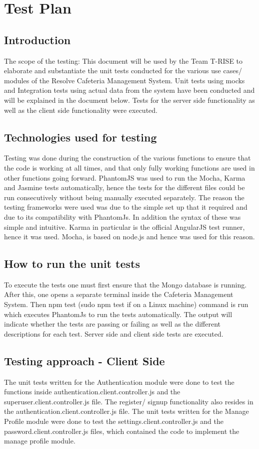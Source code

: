 \documentclass[a4paper,12pt]{report}
\begin{document}
\section{Test Plan}

\subsection{Introduction}
The scope of the testing: This document will be used by the Team T-RISE to elaborate and substantiate the unit tests conducted for the various use cases/ modules of the Resolve Cafeteria Management System. Unit tests using mocks and Integration tests using actual data from the system have been conducted and will be explained in the document below. Tests for the server side functionality as well as the client side functionality were executed.

\subsection{Technologies used for testing}
Testing was done during the construction of the various functions to ensure that the code is working at all times, and that only fully working functions are used in other functions going forward. PhantomJS was used to run the Mocha, Karma and Jasmine tests automatically, hence the tests for the different files could be run consecutively without being manually executed separately. The reason the testing frameworks were used was due to the simple set up that it required and due to its compatibility with PhantomJs. In addition the syntax of these was simple and intuitive.  Karma in particular is the official AngularJS test runner, hence it was used. Mocha, is based on node.js and hence was used for this reason. 
\\
\subsection{How to run the unit tests}
To execute the tests one must first ensure that the Mongo database is running. After this, one opens a separate terminal inside the Cafeteria Management System. Then npm test (sudo npm test if on a Linux machine) command is run which executes PhantomJs to run the tests automatically.  The output will indicate whether the tests are passing or failing as well as the different descriptions for each test. Server side and client side tests are executed.

\subsection{Testing approach - Client Side}
The unit tests written for the Authentication module were done to test the functions inside authentication.client.controller.js and the superuser.client.controller.js file.  The register/ signup functionality also resides in the authentication.client.controller.js file. The unit tests written for the Manage Profile module were done to test the settings.client.controller.js and the password.client.controller.js files, which contained the code to implement the manage profile module.
 
\end{document}
